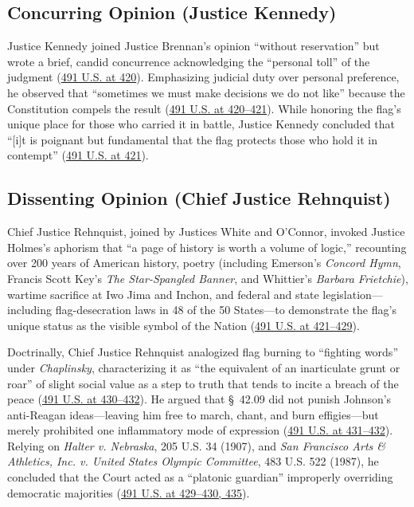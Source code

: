 \documentclass[12pt]{article}
\begin{document}
\subsection{Concurring Opinion (Justice Kennedy)}
Justice Kennedy joined Justice Brennan's opinion ``without reservation'' but wrote a brief, candid concurrence acknowledging the ``personal toll'' of the judgment (\href{https://supreme.justia.com/cases/federal/us/491/397/}{491 U.S. at 420}). Emphasizing judicial duty over personal preference, he observed that ``sometimes we must make decisions we do not like'' because the Constitution compels the result (\href{https://supreme.justia.com/cases/federal/us/491/397/}{491 U.S. at 420--421}). While honoring the flag's unique place for those who carried it in battle, Justice Kennedy concluded that ``[i]t is poignant but fundamental that the flag protects those who hold it in contempt'' (\href{https://supreme.justia.com/cases/federal/us/491/397/}{491 U.S. at 421}).

\subsection{Dissenting Opinion (Chief Justice Rehnquist)}
Chief Justice Rehnquist, joined by Justices White and O'Connor, invoked Justice Holmes's aphorism that ``a page of history is worth a volume of logic,'' recounting over 200 years of American history, poetry (including Emerson's \textit{Concord Hymn}, Francis Scott Key's \textit{The Star-Spangled Banner}, and Whittier's \textit{Barbara Frietchie}), wartime sacrifice at Iwo Jima and Inchon, and federal and state legislation---including flag-desecration laws in 48 of the 50 States---to demonstrate the flag's unique status as the visible symbol of the Nation (\href{https://supreme.justia.com/cases/federal/us/491/397/}{491 U.S. at 421--429}).

Doctrinally, Chief Justice Rehnquist analogized flag burning to ``fighting words'' under \textit{Chaplinsky}, characterizing it as ``the equivalent of an inarticulate grunt or roar'' of slight social value as a step to truth that tends to incite a breach of the peace (\href{https://supreme.justia.com/cases/federal/us/491/397/}{491 U.S. at 430--432}). He argued that \S~42.09 did not punish Johnson's anti-Reagan ideas---leaving him free to march, chant, and burn effigies---but merely prohibited one inflammatory mode of expression (\href{https://supreme.justia.com/cases/federal/us/491/397/}{491 U.S. at 431--432}). Relying on \textit{Halter v. Nebraska}, 205 U.S. 34 (1907), and \textit{San Francisco Arts \& Athletics, Inc. v. United States Olympic Committee}, 483 U.S. 522 (1987), he concluded that the Court acted as a ``platonic guardian'' improperly overriding democratic majorities (\href{https://supreme.justia.com/cases/federal/us/491/397/}{491 U.S. at 429--430, 435}).
\end{document}
